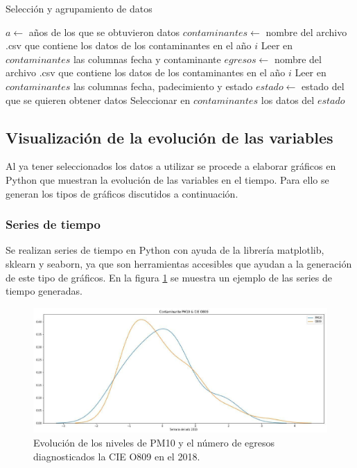 \begin{algorithm}
\caption{Selección y agrupamiento de datos}\label{alg:a1}
\begin{algorithmic}[1]
\State $a \leftarrow $ años de los que se obtuvieron datos
    \State $contaminantes \leftarrow $ nombre del archivo .csv que contiene los datos de los contaminantes en el año $i$
    \State Leer en $contaminantes$ las columnas fecha y contaminante 
    \State $egresos \leftarrow $ nombre del archivo .csv que contiene los datos de los contaminantes en el año $i$
    \State Leer en $contaminantes$ las columnas fecha, padecimiento y estado
    \State $estado \leftarrow $ estado del que se quieren obtener datos
    \State Seleccionar en $contaminantes$ los datos del $estado$
\EndFor
\end{algorithmic} 
\end{algorithm}

\subsection{Visualización de la evolución de las variables}
Al ya tener seleccionados los datos a utilizar se procede a elaborar gráficos en Python que muestran la evolución de las variables en el tiempo. Para ello se generan los tipos de gráficos discutidos a continuación.

\subsubsection{Series de tiempo}
Se realizan series de tiempo en Python con ayuda de la librería matplotlib, sklearn y seaborn, ya que son herramientas accesibles que ayudan a la generación de este tipo de gráficos. 
En la figura \ref{serie_de_tiempo} se muestra un ejemplo de las series de tiempo generadas.
\begin{figure}[h!]
\setcounter{figure}{0} %
\captionsetup{type=figure} %
\begin{center}
   \includegraphics[width=1\textwidth]{PM10_O809_2018.eps}
   \end{center}
    \caption[Ejemplo de series de tiempo]{Evolución de los niveles de PM10 y el número de egresos diagnosticados la CIE O809 en el 2018.}
    \label{serie_de_tiempo}
\end{figure}

